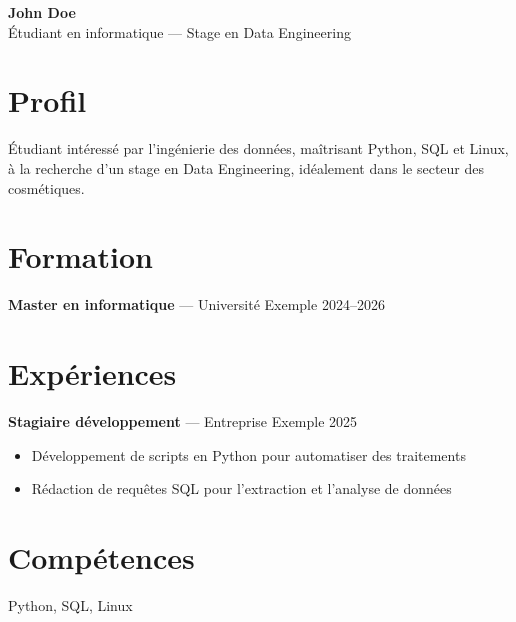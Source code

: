\documentclass[11pt,a4paper]{article}
\begin{document}
\begin{center}
{\LARGE\bfseries John Doe }\\[3pt]
Étudiant en informatique — Stage en Data Engineering
\end{center}

\section*{Profil}
Étudiant intéressé par l'ingénierie des données, maîtrisant Python, SQL et Linux, à la recherche d'un stage en Data Engineering, idéalement dans le secteur des cosmétiques.

\section*{Formation}

\textbf{Master en informatique} --- Université Exemple \hfill 2024–2026\par


\section*{Expériences}

\textbf{Stagiaire développement} --- Entreprise Exemple \hfill 2025\par
\begin{itemize}

\item Développement de scripts en Python pour automatiser des traitements

\item Rédaction de requêtes SQL pour l'extraction et l'analyse de données

\end{itemize}


\section*{Compétences}
Python, SQL, Linux
\end{document}
